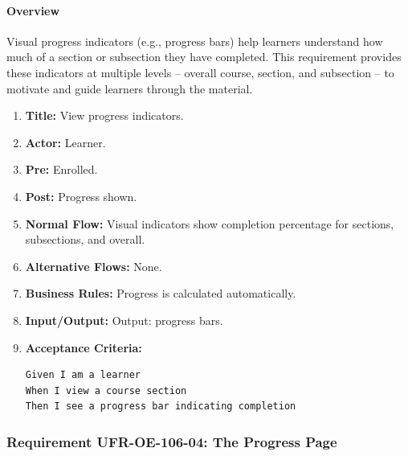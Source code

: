 \paragraph{Overview}
Visual progress indicators (e.g., progress bars) help learners understand how much of a section or subsection they have completed. This requirement provides these indicators at multiple levels – overall course, section, and subsection – to motivate and guide learners through the material.
\begin{enumerate}[label=\textbf{\arabic*.}]
\item \textbf{Title:} View progress indicators.
\item \textbf{Actor:} Learner.
\item \textbf{Pre:} Enrolled.
\item \textbf{Post:} Progress shown.
\item \textbf{Normal Flow:} Visual indicators show completion percentage for sections, subsections, and overall.
\item \textbf{Alternative Flows:} None.
\item \textbf{Business Rules:} Progress is calculated automatically.
\item \textbf{Input/Output:} Output: progress bars.
\item \textbf{Acceptance Criteria:}
    \begin{verbatim}
Given I am a learner
When I view a course section
Then I see a progress bar indicating completion
    \end{verbatim}
\end{enumerate}

\subsubsection{Requirement UFR-OE-106-04: The Progress Page}
